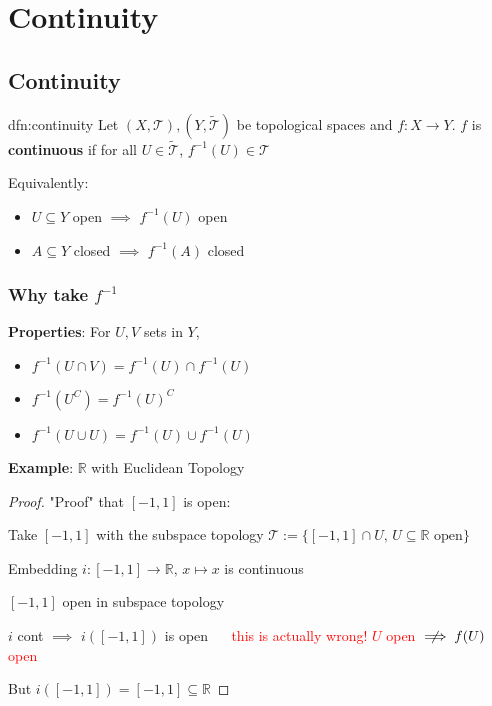 \documentclass{article}
\begin{document}
\section{Continuity}

\subsection{Continuity}

\begin{dfn}[Continuity]{dfn:continuity}{}
    Let $(X, \mathcal{T}), (Y, \tilde{\mathcal{T}})$ be topological spaces and $f : X \to Y$. $f$ is \textbf{continuous} if for all $U\in \tilde{\mathcal{T}}$, $f^{-1}(U)\in \mathcal{T}$

    \longrule{0.08ex}

    Equivalently:
    \begin{itemize}
        \item $U \subseteq Y$ open $\implies$ $f^{-1}(U)$ open
        \item $A \subseteq Y$ closed $\implies$ $f^{-1}(A)$ closed
    \end{itemize}
\end{dfn}

\subsubsection{Why take \texorpdfstring{$f^{-1}$}{f-1}}

\textbf{Properties}: For $U, V$ sets in $Y$,
\begin{itemize}
    \item $f^{-1}(U \cap V) = f^{-1}(U) \cap f^{-1}(U)$
    \item $f^{-1}(U^{C}) = f^{-1}(U)^{C}$
    \item $f^{-1}(U \cup U) = f^{-1}(U) \cup f^{-1}(U)$
\end{itemize}

\textbf{Example}: $\mathbb{R}$ with Euclidean Topology
\begin{proof}
    "Proof" that $[-1, 1]$ is open:

    Take $[-1, 1]$ with the subspace topology $\mathcal{T} := \{[-1, 1] \cap U,\, U \subseteq \mathbb{R} \text{ open}\}$

    Embedding $i : [-1, 1] \to \mathbb{R},\,x \mapsto x$ is continuous

    $[-1, 1]$ open in subspace topology

    $i$ cont $\implies$ $i([-1,1])$ is open $\quad$ \textcolor{red}{this is actually wrong! $U$ open $\centernot\implies f(U)$ open}

    But $i([-1, 1]) = [-1, 1] \subseteq \mathbb{R}$
\end{proof}
\end{document}
